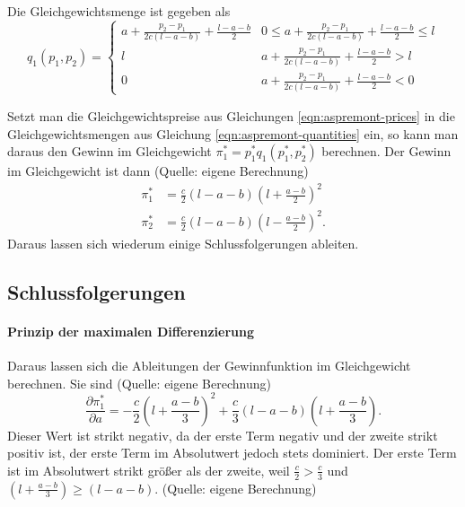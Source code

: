 Die Gleichgewichtsmenge ist gegeben als \citep[S.\,1148]{aspremont1979}
\begin{equation} \label{eqn:aspremont-quantities}
q_1(p_1,p_2) = \begin{cases}
	a+ \frac{p_2-p_1}{2c(l-a-b)} + \frac{l-a-b}{2} & 0\leq a+ \frac{p_2-p_1}{2c(l-a-b)} + \frac{l-a-b}{2} \leq l\\
	l & a+ \frac{p_2-p_1}{2c(l-a-b)} + \frac{l-a-b}{2}>l\\
	0 & a+ \frac{p_2-p_1}{2c(l-a-b)} + \frac{l-a-b}{2}<0
\end{cases}
\end{equation}

Setzt man die Gleichgewichtspreise aus Gleichungen \ref{eqn:aspremont-prices} in die Gleichgewichtsmengen aus Gleichung \ref{eqn:aspremont-quantities} ein, so kann man daraus den Gewinn im Gleichgewicht $\pi_1^*=p_1^* q_1(p_1^*, p_2^*)$ berechnen.
Der Gewinn im Gleichgewicht ist dann (Quelle: eigene Berechnung)
\begin{equation}
\begin{split}
\pi_1^* &= \frac{c}{2} (l-a-b) \left(l + \frac{a-b}{2} \right)^2\\
\pi_2^* &= \frac{c}{2} (l-a-b) \left(l - \frac{a-b}{2} \right)^2
.
\end{split}
\end{equation}
Daraus lassen sich wiederum einige Schlussfolgerungen ableiten.

\subsection{Schlussfolgerungen}

\paragraph{Prinzip der maximalen Differenzierung}
Daraus lassen sich die Ableitungen der Gewinnfunktion im Gleichgewicht berechnen.
Sie sind (Quelle: eigene Berechnung)
\begin{equation}
\frac{\partial \pi_1^*}{\partial a} = -\frac{c}{2}\left(l+\frac{a-b}{3}\right)^2 + \frac{c}{3} (l-a-b) \left( l+\frac{a-b}{3} \right)
.
\end{equation}
Dieser Wert ist strikt negativ, da der erste Term negativ und der zweite strikt positiv ist, der erste Term im Absolutwert jedoch stets dominiert.
Der erste Term ist im Absolutwert strikt größer als der zweite, weil $\frac{c}{2} > \frac{c}{3}$ und $\left(l+\frac{a-b}{3}\right) \geq (l-a-b)$. (Quelle: eigene Berechnung)

